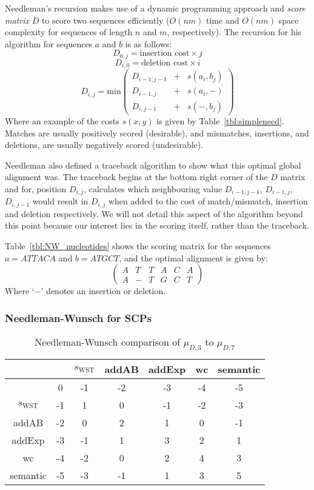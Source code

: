 Needleman's recursion makes use of a dynamic programming approach and \textit{score matrix} $D$ to score two sequences efficiently ($O(nm)$ time and $O(nm)$ space complexity for sequences of length $n$ and $m$, respectively). The recursion for his algorithm for sequences $a$ and $b$ is as follows:
\[
D_{0,j}=\text{insertion cost} \times j
\]
\[
D_{i,0}=\text{deletion cost} \times i
\]
\[
D_{i,j}=\text{min}
\begin{pmatrix}
D_{i-1,j-1} & + & s(a_i,b_j)\\
D_{i-1,j} & + & s(a_i, - )\\
D_{i,j-1} & + & s(-,b_j)
\end{pmatrix}
\]
Where an example of the costs $s(x,y)$ is given by Table~\ref{tbl:simpleneed}. Matches are usually positively scored (desirable), and mismatches, insertions, and deletions, are usually negatively scored (undesirable).

Needleman also defined a traceback algorithm to show what this optimal global alignment was. The traceback begins at the bottom right corner of the $D$ matrix and for, position $D_{i,j}$, calculates which neighbouring value $D_{i-1,j-1}$, $D_{i-1,j}$, $D_{i,j-1}$ would result in $D_{i,j}$ when added to the cost of match/mismatch, insertion and deletion respectively. We will not detail this aspect of the algorithm beyond this point because our interest lies in the scoring itself, rather than the traceback.

Table~\ref{tbl:NW_nucleotides} shows the scoring matrix for the sequences $a=ATTACA$ and $b=ATGCT$, and the optimal alignment is given by:
\[
\begin{pmatrix}
A & T & T & A & C & A \\
A & - & T & G & C & T
\end{pmatrix}
\]
Where `$-$' denotes an insertion or deletion.

\subsubsection{Needleman-Wunsch for SCPs}

\begin{table}
\begin{center}
\begin{tabular}{c | c c c c c c }
 & & $s_\text{WST}$ & addAB & addExp & wc & semantic\\
 \hline
 & 0 & -1 & -2 & -3 & -4 & -5\\
$s_\text{WST}$ & -1 & 1 & 0 & -1 & -2 & -3\\
addAB & -2 & 0 & 2 & 1 & 0 & -1\\
addExp & -3 & -1 & 1 & 3 & 2 & 1\\
wc & -4 & -2 & 0 & 2 & 4 & 3\\
semantic & -5 & -3 & -1 & 1 & 3 & 5
\end{tabular}
\caption{Needleman-Wunsch comparison of $\mu_{D,3}$ to $\mu_{D,7}$}
\label{tbl:compD3D7}
\end{center}
\end{table}

